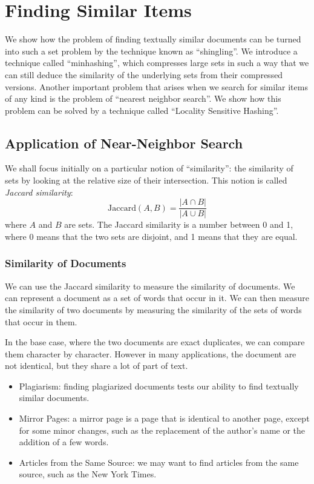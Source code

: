 \chapter{Finding Similar Items}\label{sec:finding-similar-items}

We show how the problem of finding textually similar documents can be turned into such a set problem by the technique known as ``shingling''. We introduce a technique called ``minhashing'', which compresses large sets in such a way that we can still deduce the similarity of the underlying sets from their compressed versions. Another important problem that arises when we search for similar items of any kind is the problem of ``nearest neighbor search''. We show how this problem can be solved by a technique called ``Locality Sensitive Hashing''. 

\section{Application of Near-Neighbor Search}\label{sec:application-of-near-neighbor-search}

We shall focus initially on a particular notion of ``similarity'': the similarity of sets by looking at the relative size of their intersection. This notion is called \textit{Jaccard similarity}:
\begin{equation*}
    \text{Jaccard}(A, B) = \frac{|A \cap B|}{|A \cup B|}
\end{equation*}
where $A$ and $B$ are sets. The Jaccard similarity is a number between 0 and 1, where 0 means that the two sets are disjoint, and 1 means that they are equal.

\subsection{Similarity of Documents}\label{subsec:similarity-of-documents}

We can use the Jaccard similarity to measure the similarity of documents. We can represent a document as a set of words that occur in it. We can then measure the similarity of two documents by measuring the similarity of the sets of words that occur in them.

In the base case, where the two documents are exact duplicates, we can compare them character by character. However in many applications, the document are not identical, but they share a lot of part of text.

\begin{itemize}
    \item Plagiarism: finding plagiarized documents tests our ability to find textually similar documents.
    \item Mirror Pages: a mirror page is a page that is identical to another page, except for some minor changes, such as the replacement of the author's name or the addition of a few words.
    \item Articles from the Same Source: we may want to find articles from the same source, such as the New York Times.
\end{itemize}

